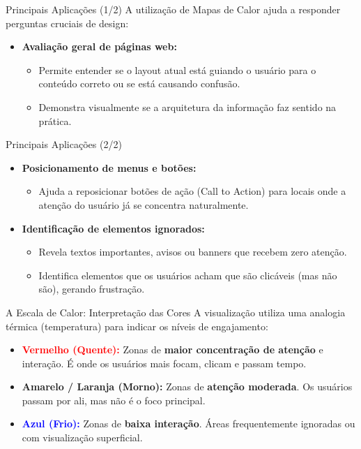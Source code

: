 \documentclass[aspectratio=169]{beamer}
\begin{document}
\begin{frame}{Principais Aplicações (1/2)}
    A utilização de Mapas de Calor ajuda a responder perguntas cruciais de design:
    \vspace{0.3cm}
    \begin{itemize}
        \item \textbf{Avaliação geral de páginas web:}
        \begin{itemize}
            \item Permite entender se o layout atual está guiando o usuário para o conteúdo correto ou se está causando confusão.
            \item Demonstra visualmente se a arquitetura da informação faz sentido na prática.
        \end{itemize}
    \end{itemize}
\end{frame}

\begin{frame}{Principais Aplicações (2/2)}
    \begin{itemize}
        \item \textbf{Posicionamento de menus e botões:} 
        \begin{itemize}
            \item Ajuda a reposicionar botões de ação (Call to Action) para locais onde a atenção do usuário já se concentra naturalmente.
        \end{itemize}
        \vspace{0.3cm}
        \item \textbf{Identificação de elementos ignorados:}
        \begin{itemize}
            \item Revela textos importantes, avisos ou banners que recebem zero atenção.
            \item Identifica elementos que os usuários acham que são clicáveis (mas não são), gerando frustração.
        \end{itemize}
    \end{itemize}
\end{frame}

\begin{frame}{A Escala de Calor: Interpretação das Cores}
    A visualização utiliza uma analogia térmica (temperatura) para indicar os níveis de engajamento:
    \vspace{0.4cm}
    \begin{itemize}
        \item \textcolor{red}{\textbf{Vermelho (Quente):}} Zonas de \textbf{maior concentração de atenção} e interação. É onde os usuários mais focam, clicam e passam tempo.
        \item \textcolor{orange!90!black}{\textbf{Amarelo / Laranja (Morno):}} Zonas de \textbf{atenção moderada}. Os usuários passam por ali, mas não é o foco principal.
        \item \textcolor{blue}{\textbf{Azul (Frio):}} Zonas de \textbf{baixa interação}. Áreas frequentemente ignoradas ou com visualização superficial.
    \end{itemize}
\end{frame}
\end{document}
